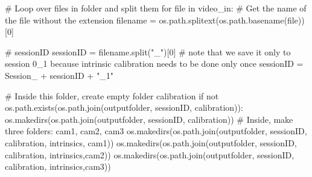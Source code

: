 \documentclass[
  letterpaper,
  DIV=11,
  numbers=noendperiod]{scrreprt}
\newenvironment{Shaded}{\begin{snugshade}}{\end{snugshade}}
\newcommand{\BuiltInTok}[1]{\textcolor[rgb]{0.00,0.23,0.31}{#1}}
\newcommand{\CommentTok}[1]{\textcolor[rgb]{0.37,0.37,0.37}{#1}}
\newcommand{\ControlFlowTok}[1]{\textcolor[rgb]{0.00,0.23,0.31}{#1}}
\newcommand{\DecValTok}[1]{\textcolor[rgb]{0.68,0.00,0.00}{#1}}
\newcommand{\KeywordTok}[1]{\textcolor[rgb]{0.00,0.23,0.31}{#1}}
\newcommand{\NormalTok}[1]{\textcolor[rgb]{0.00,0.23,0.31}{#1}}
\newcommand{\OperatorTok}[1]{\textcolor[rgb]{0.37,0.37,0.37}{#1}}
\newcommand{\StringTok}[1]{\textcolor[rgb]{0.13,0.47,0.30}{#1}}
\begin{document}
\begin{Shaded}
\begin{Highlighting}[]
\CommentTok{\# Loop over files in folder and split them}
\ControlFlowTok{for} \BuiltInTok{file} \KeywordTok{in}\NormalTok{ video\_in:}
    \CommentTok{\# Get the name of the file without the extension}
\NormalTok{    filename }\OperatorTok{=}\NormalTok{ os.path.splitext(os.path.basename(}\BuiltInTok{file}\NormalTok{))[}\DecValTok{0}\NormalTok{]}
    
    \CommentTok{\# sessionID}
\NormalTok{    sessionID }\OperatorTok{=}\NormalTok{ filename.split(}\StringTok{"\_"}\NormalTok{)[}\DecValTok{0}\NormalTok{]}
    \CommentTok{\# note that we save it only to session 0\_1 because intrinsic calibration needs to be done only once}
\NormalTok{    sessionID }\OperatorTok{=} \StringTok{\textquotesingle{}Session\_\textquotesingle{}} \OperatorTok{+}\NormalTok{ sessionID }\OperatorTok{+} \StringTok{"\_1"} 

    \CommentTok{\# Inside this folder, create empty folder \textquotesingle{}calibration\textquotesingle{}}
    \ControlFlowTok{if} \KeywordTok{not}\NormalTok{ os.path.exists(os.path.join(outputfolder, sessionID, }\StringTok{\textquotesingle{}calibration\textquotesingle{}}\NormalTok{)):}
\NormalTok{        os.makedirs(os.path.join(outputfolder, sessionID, }\StringTok{\textquotesingle{}calibration\textquotesingle{}}\NormalTok{))}
    \CommentTok{\# Inside, make three folders: cam1, cam2, cam3}
\NormalTok{    os.makedirs(os.path.join(outputfolder, sessionID, }\StringTok{\textquotesingle{}calibration\textquotesingle{}}\NormalTok{, }\StringTok{\textquotesingle{}intrinsics\textquotesingle{}}\NormalTok{, }\StringTok{\textquotesingle{}cam1\textquotesingle{}}\NormalTok{))}
\NormalTok{    os.makedirs(os.path.join(outputfolder, sessionID, }\StringTok{\textquotesingle{}calibration\textquotesingle{}}\NormalTok{, }\StringTok{\textquotesingle{}intrinsics\textquotesingle{}}\NormalTok{,}\StringTok{\textquotesingle{}cam2\textquotesingle{}}\NormalTok{))}
\NormalTok{    os.makedirs(os.path.join(outputfolder, sessionID, }\StringTok{\textquotesingle{}calibration\textquotesingle{}}\NormalTok{, }\StringTok{\textquotesingle{}intrinsics\textquotesingle{}}\NormalTok{,}\StringTok{\textquotesingle{}cam3\textquotesingle{}}\NormalTok{))}
    

\end{Highlighting}
\end{Shaded}
\end{document}
